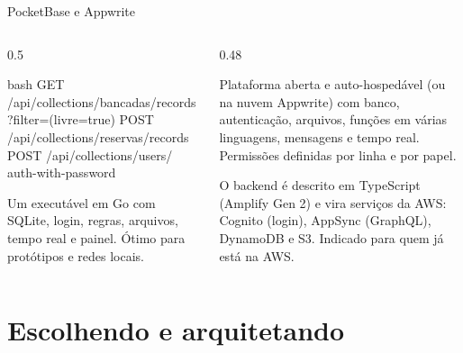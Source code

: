 \documentclass[aspectratio=169,10pt]{beamer}
\begin{document}
\begin{frame}[fragile]{PocketBase e Appwrite}
  \begin{columns}[T]
    \begin{column}{0.5\textwidth}
\begin{codigo}[title=API REST gerada (HTTP)]{bash}
GET  /api/collections/bancadas/records
     ?filter=(livre=true)
POST /api/collections/reservas/records
POST /api/collections/users/
     auth-with-password
\end{codigo}
      \begin{conceito}[PocketBase]
        Um executável em Go com SQLite, login, regras, arquivos, tempo real e painel. Ótimo para protótipos e redes locais.
      \end{conceito}
    \end{column}
    \begin{column}{0.48\textwidth}
      \begin{conceito}[Appwrite]
        Plataforma aberta e auto-hospedável (ou na nuvem Appwrite) com banco, autenticação, arquivos, funções em várias linguagens, mensagens e tempo real. Permissões definidas por linha e por papel.
      \end{conceito}
      \begin{conceito}
        O backend é descrito em TypeScript (Amplify Gen 2) e vira serviços da AWS: Cognito (login), AppSync (GraphQL), DynamoDB e S3. Indicado para quem já está na AWS.
      \end{conceito}
    \end{column}
  \end{columns}
\end{frame}

\section{Escolhendo e arquitetando}
\end{document}
